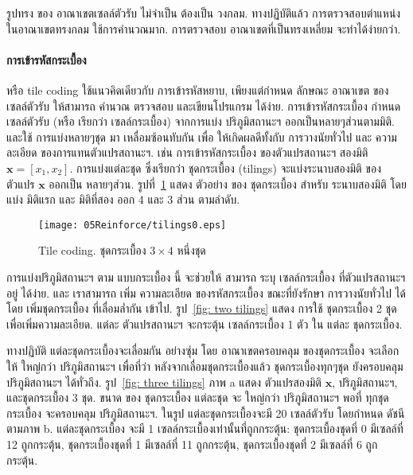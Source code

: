 รูปทรง ของ อาณาเขตเซลล์ตัวรับ ไม่จำเป็น ต้องเป็น วงกลม.
ทางปฏิบัติแล้ว การตรวจสอบตำแหน่ง ในอาณาเขตทรงกลม ใช้การคำนวณมาก.
การตรวจสอบ อาณาเขตที่เป็นทรงเหลี่ยม จะทำได้ง่ายกว่า.

\paragraph{การเข้ารหัสกระเบื้อง} 
หรือ tile coding ใช้แนวคิดเดียวกับ การเข้ารหัสหยาบ,
เพียงแต่กำหนด ลักษณะ อาณาเขต ของ เซลล์ตัวรับ ให้สามารถ คำนวณ ตรวจสอบ และเขียนโปรแกรม ได้ง่าย.
%
การเข้ารหัสกระเบื้อง กำหนดเซลล์ตัวรับ (หรือ เรียกว่า เซลล์กระเบื้อง) จากการแบ่ง ปริภูมิสถานะฯ ออกเป็นหลายๆส่วนตามมิติ.
และใช้ การแบ่งหลายๆชุด มา เหลื่อมซ้อนทับกัน เพื่อ ให้เกิดผลดีทั้งกับ การวางนัยทั่วไป และ ความละเอียด ของการแทนตัวแปรสถานะฯ.
เช่น การเข้ารหัสกระเบื้อง ของตัวแปรสถานะฯ สองมิติ $\textbf{x} = [x_1, x_2]$.
การแบ่งแต่ละชุด ซึ่งเรียกว่า ชุดกระเบื้อง (tilings) จะแบ่งระนาบสองมิติ ของ ตัวแปร $\textbf{x}$ ออกเป็น หลายๆส่วน.
รูปที่~\ref{fig: tile coding tiling0} แสดง ตัวอย่าง ของ ชุดกระเบื้อง สำหรับ ระนาบสองมิติ โดย แบ่ง มิติแรก และ มิติที่สอง ออก 4 และ 3 ส่วน ตามลำดับ.

%
\begin{figure}
\begin{center}
\texttt{[image: 05Reinforce/tilings0.eps]}
\end{center}
\caption{Tile coding. ชุดกระเบื้อง $3 \times 4$ หนึ่งชุด}
\label{fig: tile coding tiling0}
\end{figure}

การแบ่งปริภูมิสถานะฯ ตาม แบบกระเบื้อง นี้ จะช่วยให้ สามารถ ระบุ เซลล์กระเบื้อง ที่ตัวแปรสถานะฯ อยู่ ได้ง่าย.
และ เราสามารถ เพิ่ม ความละเอียด ของรหัสกระเบื้อง ขณะที่ยังรักษา การวางนัยทั่วไป ได้โดย เพิ่มชุดกระเบื้อง ที่เลื่อมล่ำกัน เข้าไป.
รูป~\ref{fig: two tilings} แสดง การใช้ ชุดกระเบื้อง 2 ชุด เพื่อเพิ่มความละเอียด.
แต่ละ ตัวแปรสถานะฯ จะกระตุ้น เซลล์กระเบื้อง 1 ตัว ใน แต่ละ ชุดกระเบื้อง.

ทางปฏิบัติ แต่ละชุดกระเบื้องจะเลื่อมกัน อย่างซุ่ม โดย อาณาเขตครอบคลุม ของชุดกระเบื้อง จะเลือกให้ ใหญ่กว่า ปริภูมิสถานะฯ เพื่อที่ว่า หลังจากเลื่อมชุดกระเบื้องแล้ว ชุดกระเบื้องทุกๆชุด ยังครอบคลุม ปริภูมิสถานะฯ ได้ทั่วถึง.
รูป~\ref{fig: three tilings} ภาพ a แสดง ตัวแปรสองมิติ $\textbf{x}$, ปริภูมิสถานะฯ, และชุดกระเบื้อง 3 ชุด. 
ขนาด ของ ชุดกระเบื้อง แต่ละชุด จะ ใหญ่กว่า ปริภูมิสถานะฯ พอที่ ทุกชุดกระเบื้อง จะครอบคลุม ปริภูมิสถานะฯ.
ในรูป แต่ละชุดกระเบื้องจะมี 20 เซลล์ตัวรับ โดยกำหนด ดัชนี ตามภาพ b.
แต่ละชุดกระเบื้อง จะมี 1 เซลล์กระเบื้องเท่านั้นที่ถูกกระตุ้น:
ชุดกระเบื้องชุดที่ 0 มีเซลล์ที่ 12 ถูกกระตุ้น,
ชุดกระเบื้องชุดที่ 1 มีเซลล์ที่ 11 ถูกกระตุ้น,
ชุดกระเบื้องชุดที่ 2 มีเซลล์ที่ 6 ถูกกระตุ้น.

